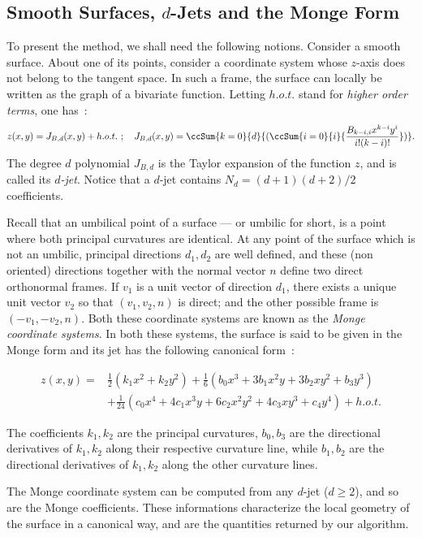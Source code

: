 \subsection{Smooth Surfaces, $d$-Jets and the Monge Form}

To present the method, we shall need the following notions. Consider a
smooth surface.  About one of its points, consider a coordinate system
whose $z$-axis does not belong to the tangent space. In such a frame,
the surface can locally be written as the graph of a bivariate
function. Letting $h.o.t.$ stand for {\em higher order terms}, one
has~:
%
\begin{equation}
z(x,y)=J_{B,d}(x,y) + h.o.t. \ ; \quad 
J_{B,d}(x,y)=\ccSum{k=0}{d}{(\ccSum{i=0}{i}{
\frac{B_{k-i,i}x^{k-i}y^{i}}{i!(k-i)!}})}.
\end{equation}
The degree $d$ polynomial $J_{B,d}$ is the Taylor expansion of the
function $z$, and is called its {\em $d$-jet}. Notice that a $d$-jet contains
$N_d=(d+1)(d+2)/2$ coefficients.

Recall that an umbilical point of a surface --- or umbilic for short,
is a point where both principal curvatures are identical.  At any
point of the surface which is not an umbilic, principal directions
$d_1, d_2$ are well defined, and these (non oriented) directions
together with the normal vector $n$ define two direct orthonormal
frames. If $v_1$ is a unit vector of direction $d_1$, there exists a
unique unit vector $v_2$ so that $(v_1,v_2,n)$ is direct; and the
other possible frame is $(-v_1,-v_2,n)$.  Both these coordinate
systems are known as the {\em Monge coordinate systems}. In both these
systems, the surface is said to be given in the Monge form and its jet
has the following canonical form~:

\begin{eqnarray}
\label{eq:monge}
z(x,y) =  & \frac{1}{2}(k_1x^2 + k_2y^2)+
	\frac{1}{6}(b_0x^3+3b_1x^2y+3b_2xy^2+b_3y^3) \\
  &  +\frac{1}{24}(c_0x^4+4c_1x^3y+6c_2x^2y^2+4c_3xy^3+c_4y^4) + h.o.t.
\end{eqnarray}

The coefficients $k_1, k_2$ are the principal curvatures,
$b_0,b_3$ are the directional derivatives of $k_1,k_2$ along their
respective curvature line, while $b_1,b_2$ are the directional
derivatives of $k_1,k_2$ along the other curvature lines.

The Monge coordinate system can be computed from any $d$-jet ($d\geq
2$), and so are the Monge coefficients. These informations
characterize the local geometry of the surface in a canonical way, and
are the quantities returned by our algorithm.


